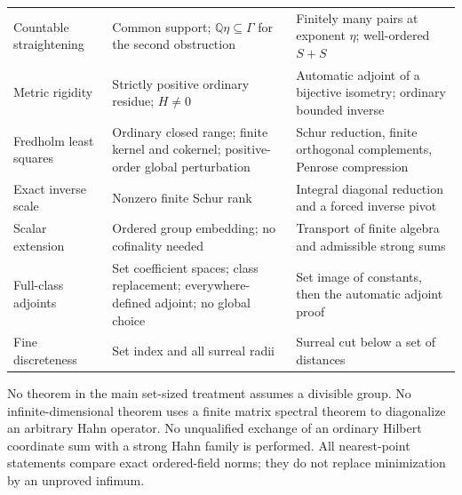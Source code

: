 \documentclass[11pt,letterpaper]{article}
\numberwithin{equation}{section}
\theoremstyle{definition}
\theoremstyle{remark}
\newcommand{\Q}{\mathbb Q}
\begin{document}
{\begin{longtable}{@{}>{\raggedright\arraybackslash}p{}>{\raggedright\arraybackslash}p{}>{\raggedright\arraybackslash}p{}@{}}
Countable straightening & Common support; $\Q\eta\subseteq\Gamma$ for the
second obstruction & Finitely many pairs at exponent $\eta$; well-ordered
$S+S$\\[.4em]
Metric rigidity & Strictly positive ordinary residue; $H\ne0$ &
Automatic adjoint of a bijective isometry; ordinary bounded inverse\\[.4em]
Fredholm least squares & Ordinary closed range; finite kernel and cokernel;
positive-order global perturbation & Schur reduction, finite orthogonal
complements, Penrose compression\\[.4em]
Exact inverse scale & Nonzero finite Schur rank
 & Integral diagonal reduction and a forced inverse pivot\\[.4em]
Scalar extension & Ordered group embedding; no cofinality needed
 & Transport of finite algebra and admissible strong sums\\[.4em]
Full-class adjoints & Set coefficient spaces; class replacement;
everywhere-defined adjoint; no global choice
 & Set image of constants, then the automatic adjoint proof\\[.4em]
Fine discreteness & Set index and all surreal radii
 & Surreal cut below a set of distances\\
\bottomrule
\end{longtable}}

No theorem in the main set-sized treatment assumes a divisible group.
No infinite-dimensional theorem uses a finite matrix spectral theorem
to diagonalize an arbitrary Hahn operator. No unqualified exchange
of an ordinary Hilbert coordinate sum with a strong Hahn family is
performed. All nearest-point statements compare exact ordered-field
norms; they do not replace minimization by an unproved infimum.
\end{document}
